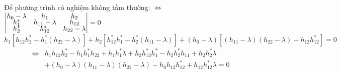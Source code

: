 \documentclass{article}
\begin{document}
Để phương trình có nghiệm không tầm thường: $\Leftrightarrow$
$
	\begin{vmatrix}
		\renewcommand{\arraystretch}{0.5}
		h_0 - \lambda & h_1              & h_2              \\
		h_1^*         & h_{11} - \lambda & h_{12}           \\
		h_2^*         & h_{12}^*         & h_{22} - \lambda
	\end{vmatrix} = 0
$
\begin{equation*}
	h_{1}^{}\left[h_{12}^{}h_2^* - h_1^*(h_{22}^{} - \lambda)\right] + h_2^{}\left[h_{12}^* h_1^* - h_2^*(h_{11}^{} - \lambda) \right] + (h_0^{} - \lambda)\left[(h_{11}^{} - \lambda)(h_{22}^{} - \lambda) - h_{12}^{}h_{12}^*\right] = 0
\end{equation*}
\begin{align*}
	\Leftrightarrow & h_{1}^{} h_{12}^{} h_2^{*} - h_{1}^{} h_{1}^{*} h_{22}^{} + h_{1}^{} h_{1}^{*} \lambda + h_{2}^{} h_{12}^{*} h_1^{*} - h_{2}^{} h_{2}^{*} h_{11} + h_{2}^{} h_{2}^{*} \lambda \\
	                & + (h_{0}^{} - \lambda) (h_{11}^{} - \lambda) (h_{22}^{} - \lambda) - h_{0}^{} h_{12}^{} h_{12}^{*} + h_{12}^{} h_{12}^{*} \lambda = 0
\end{align*}
\end{document}
